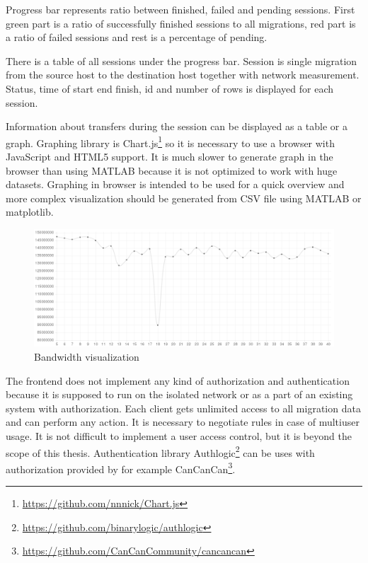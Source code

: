 Progress bar represents ratio between finished, failed and pending sessions. First green part is a ratio of successfully finished sessions to all migrations, red part is a ratio of failed sessions and rest is a percentage of pending. 

There is a table of all sessions under the progress bar. Session is single migration from the source host to the destination host together with network measurement.
Status, time of start end finish, id and number of rows is displayed for each session.

Information about transfers during the session can be displayed as a table or a graph. Graphing library is Chart.js\footnote{\url{https://github.com/nnnick/Chart.js}} so it is necessary to use a browser with JavaScript and \Ac{HTML}5 support. It is much slower to generate graph in the browser than using MATLAB because it is not optimized to work with huge datasets. Graphing in browser is intended to be used for a quick overview and more complex visualization should be generated from \Ac{CSV} file using MATLAB or matplotlib.

\begin{figure}[htb]
	\begin{center}
	\includegraphics[width=\textwidth]{themis-graph-bw-1457.png}
	\end{center}
	\caption{Bandwidth visualization}
	\label{img:themis-graph}
\end{figure}

The frontend does not implement any kind of authorization and authentication because it is supposed to run on the isolated network or as a part of an existing system with authorization. Each client gets unlimited access to all migration data and can perform any action. It is necessary to negotiate rules in case of multiuser usage. It is not difficult to implement a user access control, but it is beyond the scope of this thesis. Authentication library Authlogic\footnote{\url{https://github.com/binarylogic/authlogic}} can be uses with authorization provided by for example CanCanCan\footnote{\url{https://github.com/CanCanCommunity/cancancan}}.
